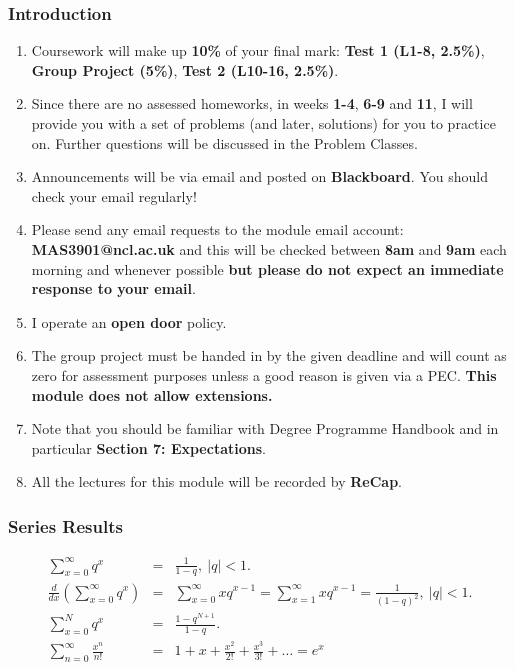 \documentclass[serif,10pt,compress]{beamer}
\begin{document}
\begin{frame}[t]
	\frametitle{Introduction}
	\begin{enumerate}[--]
		\item Coursework will make up {\bf 10\%} of your final mark: {\bf Test 1 (L1-8, 2.5\%)}, {\bf Group Project (5\%)}, {\bf Test 2 (L10-16, 2.5\%)}. 
		\item Since there are no assessed homeworks, in weeks {\bf 1-4}, {\bf 6-9} and {\bf 11}, I will provide you with a set of problems (and later, solutions) for you to practice on. Further questions will be discussed in the Problem Classes.
		\item Announcements will be via email and posted on {\bf Blackboard}. You should check your email regularly!
		\item Please send any email requests to the module email account: {\bf MAS3901@ncl.ac.uk} and this will be checked between {\bf 8am} and {\bf 9am} each morning and whenever possible {\bf but please do not expect an immediate response to your email}. 
		\item I operate an {\bf open door} policy. 
		\item The group project must be handed in by the given deadline and will count as zero for assessment purposes unless a good reason is given via a PEC. {\bf This module does not allow extensions.}
		\item Note that you should be familiar with Degree Programme Handbook and in particular {\bf Section 7: Expectations}. 
		\item All the lectures for this module will be recorded by {\bf ReCap}. 
		
	\end{enumerate}
\end{frame}

\begin{frame}[t]
	\frametitle{Series Results}
	\begin{eqnarray*}
		\sum_{x=0}^{\infty} q^x &=& \frac{1}{1-q}, \ |q|<1. \\
		\frac{d}{dx}\left(\sum_{x=0}^{\infty} q^x \right) &=& \sum_{x=0}^{\infty} xq^{x-1}=\sum_{x=1}^{\infty} xq^{x-1} = \frac{1}{(1-q)^2}, \ |q|<1. \\
		\sum_{x=0}^{N} q^x &=& \frac{1-q^{N+1}}{1-q}. \\
		\sum_{n=0}^{\infty} \frac{x^n}{n!} &=& 1+x+\frac{x^2}{2!}+\frac{x^3}{3!}+\ldots = e^x
	\end{eqnarray*}
\end{frame}
\end{document}
